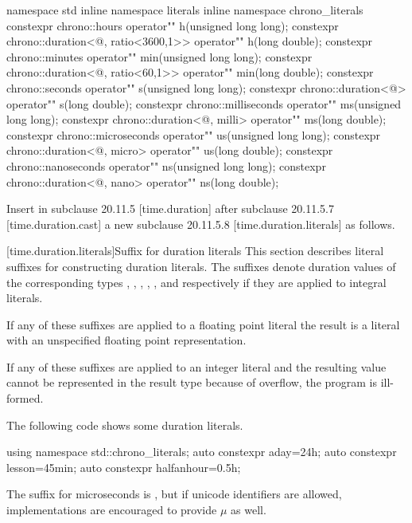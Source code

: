 \documentclass[ebook,11pt,article]{memoir}
\begin{document}
\begin{codeblock}
namespace std {
inline namespace literals {
inline namespace chrono_literals{
constexpr 
chrono::hours operator"" h(unsigned long long);
constexpr 
chrono::duration<@\unspec@, ratio<3600,1>> operator"" h(long double);
constexpr 
chrono::minutes operator"" min(unsigned long long);
constexpr 
chrono::duration<@\unspec@, ratio<60,1>> operator"" min(long double);
constexpr 
chrono::seconds operator"" s(unsigned long long);
constexpr 
chrono::duration<@\unspec@> operator"" s(long double);
constexpr 
chrono::milliseconds operator"" ms(unsigned long long);
constexpr 
chrono::duration<@\unspec@, milli> operator"" ms(long double);
constexpr 
chrono::microseconds operator"" us(unsigned long long);
constexpr 
chrono::duration<@\unspec@, micro> operator"" us(long double);
constexpr 
chrono::nanoseconds operator"" ns(unsigned long long);
constexpr 
chrono::duration<@\unspec@, nano> operator"" ns(long double);
}}}
\end{codeblock}

Insert in subclause 20.11.5 [time.duration] after subclause 20.11.5.7 [time.duration.cast] a new subclause 20.11.5.8 [time.duration.literals] as follows.

[time.duration.literals]{Suffix for duration literals}
\pnum
This section describes literal suffixes for constructing duration literals. The suffixes  denote duration values of the corresponding types , , , , , and  respectively if they are applied to integral literals. 

\pnum
If any of these suffixes are applied to a floating point literal the result is a  literal with an unspecified floating point representation.

\pnum
If any of these suffixes are applied to an integer literal and the resulting  value cannot be represented in the result type because of overflow, the program is ill-formed.

\pnum
\enterexample 
The following code shows some duration literals.
\begin{codeblock}
{
    using namespace std::chrono_literals;
    auto constexpr aday=24h; 
    auto constexpr lesson=45min; 
    auto constexpr halfanhour=0.5h;
}
\end{codeblock}
\exitexample

\pnum
\enternote
The suffix for microseconds is , but if unicode identifiers are allowed, implementations are encouraged to provide $\mu{}$ as well.
\exitnote
\end{document}
